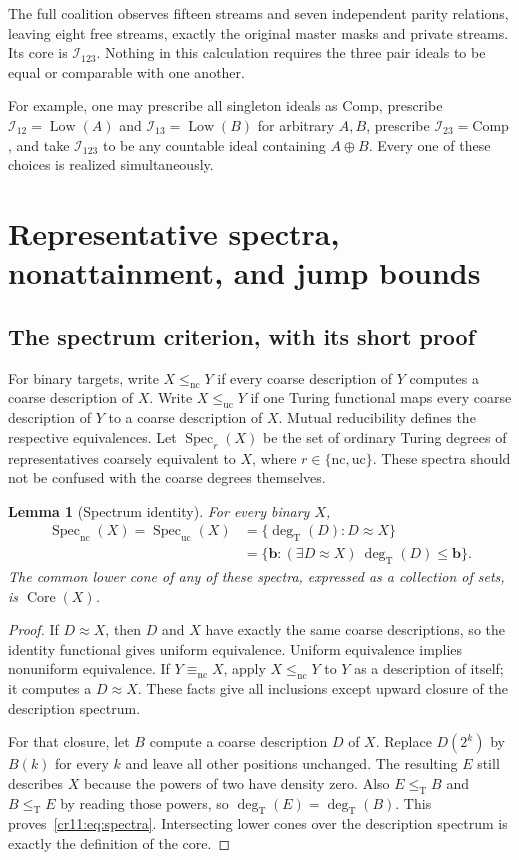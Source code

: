 \documentclass[11pt,letterpaper]{article}
\theoremstyle{plain}
\newtheorem{lemma}[theorem]{Lemma}
\theoremstyle{definition}
\theoremstyle{remark}
\numberwithin{equation}{section}
\newcommand{\leT}{\leq_{\mathrm T}}
\newcommand{\Core}{\operatorname{Core}}
\newcommand{\Spec}{\operatorname{Spec}}
\newcommand{\Low}{\operatorname{Low}}
\newcommand{\Comp}{\mathrm{Comp}}
\newcommand{\degT}{\deg_{\mathrm T}}
\newcommand{\join}{\mathbin{\oplus}}
\newcommand{\nc}{\mathrm{nc}}
\newcommand{\uc}{\mathrm{uc}}
\newcommand{\I}{\mathcal I}
\begin{document}
The full coalition observes fifteen streams and seven independent parity
relations, leaving eight free streams, exactly the original master masks
and private streams. Its core is $\I_{123}$. Nothing in this calculation
requires the three pair ideals to be equal or comparable with one another.

For example, one may prescribe all singleton ideals as $\Comp$, prescribe
$\I_{12}=\Low(A)$ and $\I_{13}=\Low(B)$ for arbitrary $A,B$, prescribe
$\I_{23}=\Comp$, and take $\I_{123}$ to be any countable ideal containing
$A\join B$. Every one of these choices is realized simultaneously.

\section{Representative spectra, nonattainment, and jump bounds}\label{cr11:sec:bounds}

\subsection{The spectrum criterion, with its short proof}

For binary targets, write $X\leq_{\nc}Y$ if every coarse description of $Y$
computes a coarse description of $X$. Write $X\leq_{\uc}Y$ if one Turing
functional maps every coarse description of $Y$ to a coarse description of
$X$. Mutual reducibility defines the respective equivalences. Let
$\Spec_r(X)$ be the set of ordinary Turing degrees of representatives
coarsely equivalent to $X$, where $r\in\{\nc,\uc\}$. These spectra should
not be confused with the coarse degrees themselves.

\begin{lemma}[Spectrum identity]\label{cr11:lem:spectrum}
For every binary $X$,
\begin{align}\label{cr11:eq:spectra}
 \Spec_{\nc}(X)=\Spec_{\uc}(X)
 &=\{\degT(D):D\approx X\}\\
 &=\{\mathbf b:(\exists D\approx X)\ \degT(D)\leq\mathbf b\}.
 \nonumber
\end{align}
The common lower cone of any of these spectra, expressed as a collection
of sets, is $\Core(X)$.
\end{lemma}
\begin{proof}
If $D\approx X$, then $D$ and $X$ have exactly the same coarse descriptions,
so the identity functional gives uniform equivalence. Uniform equivalence
implies nonuniform equivalence. If $Y\equiv_{\nc}X$, apply $X\leq_{\nc}Y$
to $Y$ as a description of itself; it computes a $D\approx X$.
These facts give all inclusions except upward closure of the description
spectrum.

For that closure, let $B$ compute a coarse description $D$ of $X$. Replace
$D(2^k)$ by $B(k)$ for every $k$ and leave all other positions unchanged.
The resulting $E$ still describes $X$ because the powers of two have density
zero. Also $E\leT B$ and $B\leT E$ by reading those powers, so
$\degT(E)=\degT(B)$. This proves~\eqref{cr11:eq:spectra}. Intersecting lower cones
over the description spectrum is exactly the definition of the core.
\end{proof}
\end{document}
